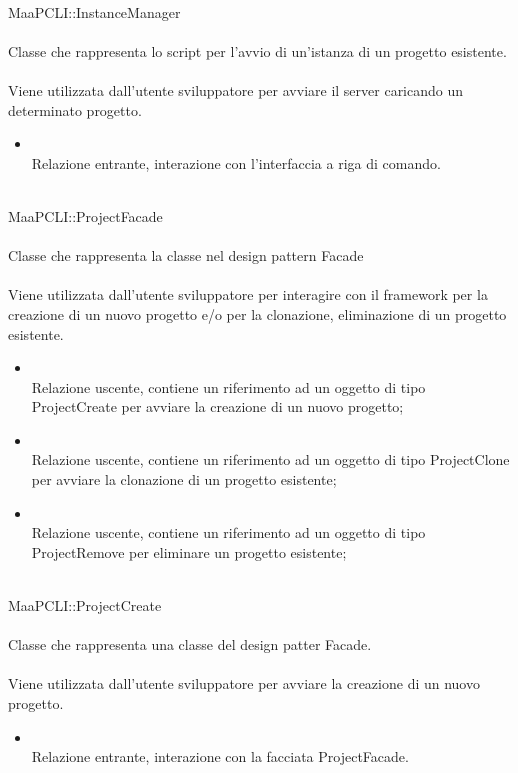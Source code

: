 \\
MaaPCLI::InstanceManager\\
\\
Classe che rappresenta lo script per l'avvio di un'istanza di un progetto esistente.\\
\\
Viene utilizzata dall'utente sviluppatore per avviare il server caricando un determinato progetto.\\
\begin{itemize}
\item{}\\
Relazione entrante, interazione con l'interfaccia a riga di comando.
\end{itemize}

\\
MaaPCLI::ProjectFacade\\
\\
Classe che rappresenta la classe  nel design pattern Facade\\
\\
Viene utilizzata dall'utente sviluppatore per interagire con il framework per la creazione di un nuovo progetto e/o per la clonazione, eliminazione di un progetto esistente.\\
\begin{itemize}
\item{}\\
Relazione uscente, contiene un riferimento ad un oggetto di tipo ProjectCreate per avviare la creazione di un nuovo progetto;
\item{}\\
Relazione uscente, contiene un riferimento ad un oggetto di tipo ProjectClone per avviare la clonazione di un progetto esistente;
\item{}\\
Relazione uscente, contiene un riferimento ad un oggetto di tipo ProjectRemove per eliminare un progetto esistente;
\end{itemize}

\\
MaaPCLI::ProjectCreate\\
\\
Classe che rappresenta una classe del design patter Facade.\\
\\
Viene utilizzata dall'utente sviluppatore per avviare la creazione di un nuovo progetto.\\
\begin{itemize}
\item{}\\
Relazione entrante, interazione con la facciata ProjectFacade.
\end{itemize}

